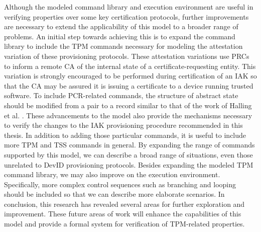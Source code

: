 Although the modeled command library and execution environment are useful in verifying properties over some key certification protocols, further improvements are necessary to extend the applicability of this model to a broader range of problems. An initial step towards achieving this is to expand the command library to include the TPM commands necessary for modeling the attestation variation of these provisioning protocols. These attestation variations use PRCs to inform a remote CA of the internal state of a certificate-requesting entity. This variation is strongly encouraged to be performed during certification of an IAK so that the CA may be assured it is issuing a certificate to a device running trusted software. To include PCR-related commands, the structure of abstract state should be modified from a pair to a record similar to that of the work of Halling et al. \cite{PrivacyCAAnalysis-Hall}. These advancements to the model also provide the mechanisms necessary to verify the changes to the IAK provisioning procedure recommended in this thesis. In addition to adding those particular commands, it is useful to include more TPM and TSS commands in general. By expanding the range of commands supported by this model, we can describe a broad range of situations, even those unrelated to DevID provisioning protocols.  Besides expanding the modeled TPM command library, we may also improve on the execution environment. Specifically, more complex control sequences such as branching and looping should be included so that we can describe more elaborate scenarios.  In conclusion, this research has revealed several areas for further exploration and improvement. These future areas of work will enhance the capabilities of this model and provide a formal system for verification of TPM-related properties.

